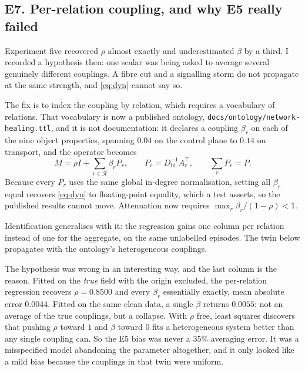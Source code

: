 \documentclass[11pt,a4paper]{article}
\newcommand{\code}[1]{\texttt{#1}}
\newcommand{\Rel}{\mathcal{R}}
\begin{document}
\subsection*{E7. Per-relation coupling, and why E5 really failed}
Experiment five recovered $\rho$ almost exactly and underestimated $\beta$ by a third. I recorded
a hypothesis then: one scalar was being asked to average several genuinely different couplings.
A fibre cut and a signalling storm do not propagate at the same strength, and
\eqref{eq:dyn} cannot say so.

The fix is to index the coupling by relation, which requires a vocabulary of relations. That
vocabulary is now a published ontology, \code{docs/ontology/network-healing.ttl}, and it is not
documentation: it declares a coupling $\beta_r$ on each of the nine object properties, spanning
$0.04$ on the control plane to $0.14$ on transport, and the operator becomes
\begin{equation}
M=\rho I+\sum_{r\in\Rel}\beta_r P_r,\qquad P_r=D_{\mathrm{in}}^{-1}A_r^{\top},\qquad \sum_{r}P_r=P .
\label{eq:perrel}
\end{equation}
Because every $P_r$ uses the same global in-degree normalisation, setting all $\beta_r$ equal
recovers \eqref{eq:dyn} to floating-point equality, which a test asserts, so the published
results cannot move. Attenuation now requires $\max_r\beta_r/(1-\rho)<1$.

Identification generalises with it: the regression gains one column per relation instead of one
for the aggregate, on the same unlabelled episodes. The twin below propagates with the ontology's
heterogeneous couplings.


The hypothesis was wrong in an interesting way, and the last column is the reason. Fitted on the
\emph{true} field with the origin excluded, the per-relation regression recovers $\rho=0.8500$ and
every $\beta_r$ essentially exactly, mean absolute error $0.0044$. Fitted on the same clean data,
a single $\beta$ returns $0.0055$: not an average of the true couplings, but a collapse. With
$\rho$ free, least squares discovers that pushing $\rho$ toward $1$ and $\beta$ toward $0$ fits a
heterogeneous system better than any single coupling can. So the E5 bias was never a $35\%$
averaging error. It was a misspecified model abandoning the parameter altogether, and it only
looked like a mild bias because the couplings in that twin were uniform.
\end{document}
